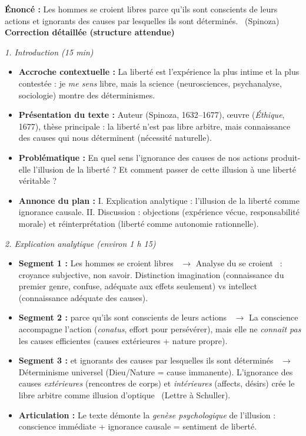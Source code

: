 \documentclass[11pt]{article}
\newcommand{\cle}[1]{{\popxbold\color{popdark}#1}}
\begin{document}
\begin{exoresolu}
\textbf{Énoncé :} \guillemotleft Les hommes se croient libres parce qu'ils sont conscients de leurs actions et ignorants des causes par lesquelles ils sont déterminés. \guillemotright\ (Spinoza)
\tcblower
\textbf{Correction détaillée (structure attendue)}

\emph{1. Introduction (15 min)}
\begin{itemize}
    \item \textbf{Accroche contextuelle :} La liberté est l'expérience la plus intime et la plus contestée : je \emph{me sens} libre, mais la science (neurosciences, psychanalyse, sociologie) montre des déterminismes.
    \item \textbf{Présentation du texte :} Auteur (Spinoza, 1632--1677), œuvre (\emph{Éthique}, 1677), thèse principale : la liberté n'est pas libre arbitre, mais \cle{connaissance des causes} qui nous déterminent (\cle{nécessité naturelle}).
    \item \textbf{Problématique :} \guillemotleft En quel sens l'ignorance des causes de nos actions produit-elle l'illusion de la liberté ? Et comment passer de cette illusion à une liberté véritable ? \guillemotright
    \item \textbf{Annonce du plan :} I. Explication analytique : l'illusion de la liberté comme ignorance causale. II. Discussion : objections (expérience vécue, responsabilité morale) et réinterprétation (liberté comme autonomie rationnelle).
\end{itemize}

\emph{2. Explication analytique (environ 1 h 15)}
\begin{itemize}
    \item \textbf{Segment 1 :} \guillemotleft Les hommes se croient libres \guillemotright\ $\rightarrow$ Analyse du \guillemotleft se croient \guillemotright\ : croyance subjective, non savoir. Distinction \cle{imagination} (connaissance du premier genre, confuse, adéquate aux effets seulement) vs \cle{intellect} (connaissance adéquate des causes).
    \item \textbf{Segment 2 :} \guillemotleft parce qu'ils sont conscients de leurs actions \guillemotright\ $\rightarrow$ La conscience accompagne l'action (\emph{conatus}, effort pour persévérer), mais elle ne \emph{connaît pas} les causes efficientes (causes extérieures + nature propre).
    \item \textbf{Segment 3 :} \guillemotleft et ignorants des causes par lesquelles ils sont déterminés \guillemotright\ $\rightarrow$ Déterminisme universel (Dieu/Nature = cause immanente). L'ignorance des causes \emph{extérieures} (rencontres de corps) et \emph{intérieures} (affects, désirs) crée le \cle{libre arbitre} comme \guillemotleft illusion d'optique \guillemotright\ (Lettre à Schuller).
    \item \textbf{Articulation :} Le texte démonte la \emph{genèse psychologique} de l'illusion : conscience immédiate + ignorance causale = sentiment de liberté.
\end{itemize}


\end{exoresolu}
\end{document}
